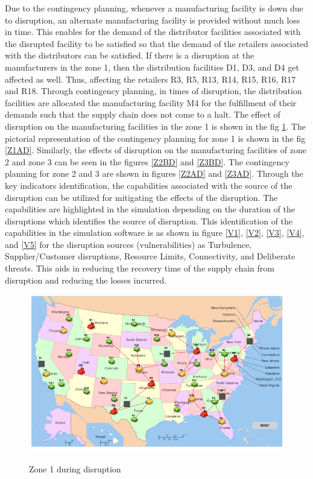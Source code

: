 Due to the contingency planning, whenever a manufacturing facility is down due to disruption, an alternate manufacturing facility is provided without much loss in time. This enables for the demand of the distributor facilities associated with the disrupted facility to be satisfied so that the demand of the retailers associated with the distributors can be satisfied. If there is a disruption at the manufacturers in the zone 1, then the distribution facilities D1, D3, and D4 get affected as well. Thus, affecting the retailers R3, R5, R13, R14, R15, R16, R17 and R18. Through contingency planning, in times of disruption, the distribution facilities are allocated the manufacturing facility M4 for the fulfillment of their demands such that the supply chain does not come to a halt. The effect of disruption on the manufacturing facilities in the zone 1 is shown in the fig \ref{Z1BD}. The pictorial representation of the contingency planning for zone 1 is shown in the fig \ref{Z1AD}. Similarly, the effects of disruption on the manufacturing facilities of zone 2 and zone 3 can be seen in the figures \ref{Z2BD} and \ref{Z3BD}. The contingency planning for zone 2 and 3 are shown in figures \ref{Z2AD} and \ref{Z3AD}. Through the key indicators identification, the capabilities associated with the source of the disruption can be utilized for mitigating the effects of the disruption. The capabilities are highlighted in the simulation depending on the duration of the disruptions which identifies the source of disruption. This identification of the capabilities in the simulation software is as shown in figure \ref{V1}, \ref{V2}, \ref{V3}, \ref{V4}, and \ref{V5} for the disruption sources (vulnerabilities) as Turbulence, Supplier/Customer disruptions, Resource Limits, Connectivity, and Deliberate threats. This aids in reducing the recovery time of the supply chain from disruption and reducing the losses incurred.

\begin{figure}[H]
  \centering
  \includegraphics[width=6.5in]{figures/pdf/Z1BD.png}\\
  \caption{Zone 1 during disruption}\label{Z1BD}
\end{figure}  

